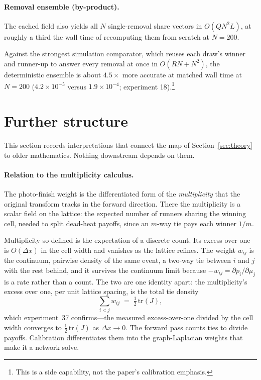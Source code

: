 \documentclass[12pt]{article}
\theoremstyle{remark}
\begin{document}
\paragraph{Removal ensemble (by-product).} The cached field also yields
all $N$ single-removal share vectors in $O(QN^2L)$, at roughly a third
the wall time of recomputing them from scratch at $N=200$.

Against the strongest simulation comparator, which reuses each draw's
winner and runner-up to answer every removal at once in $O(RN + N^2)$, the
deterministic ensemble is about $4.5\times$ more accurate at matched wall
time at $N=200$ ($4.2\times10^{-5}$ versus $1.9\times10^{-4}$;
experiment 18).\footnote{This is a side capability, not the paper's calibration emphasis.}

\section{Further structure}\label{sec:structure}

This section records interpretations that connect the map of
Section~\ref{sec:theory} to older mathematics. Nothing downstream
depends on them.

\paragraph{Relation to the multiplicity calculus.} The photo-finish weight
is the differentiated form of the \emph{multiplicity} that the original
transform \citep{cotton2021} tracks in the forward direction. There the
multiplicity is a scalar field on the lattice: the expected number of
runners sharing the winning cell, needed to split dead-heat payoffs,
since an $m$-way tie pays each winner $1/m$.

Multiplicity so defined is the expectation of a discrete count. Its
excess over one is $O(\Delta x)$ in the cell width and vanishes as
the lattice refines. The weight $w_{ij}$ is the continuum, pairwise
density of the same event, a two-way tie between $i$ and $j$ with the
rest behind, and it survives the continuum limit because
$-w_{ij} = \partial p_i/\partial\mu_j$ is a rate rather than a count. The
two are one identity apart: the multiplicity's excess over one, per unit
lattice spacing, is the total tie density
\[
\sum_{i<j} w_{ij} \;=\; \tfrac12\,\mathrm{tr}(J),
\]
which experiment~37 confirms---the measured excess-over-one divided by
the cell width converges to $\tfrac12\,\mathrm{tr}(J)$ as
$\Delta x \to 0$. The forward pass counts ties to divide payoffs.
Calibration differentiates them into the graph-Laplacian weights that
make it a network solve.
\end{document}
